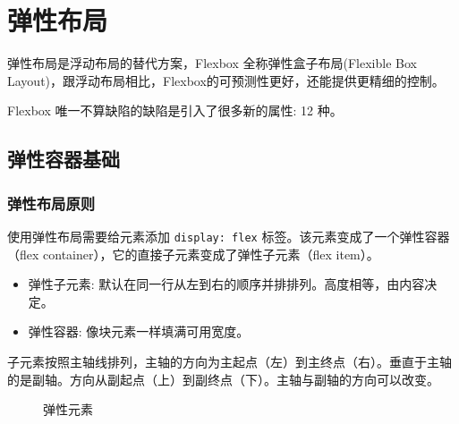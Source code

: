 \section{弹性布局}

弹性布局是浮动布局的替代方案，Flexbox 全称弹性盒子布局(Flexible Box Layout)，跟浮动布局相比，Flexbox的可预测性更好，还能提供更精细的控制。

Flexbox 唯一不算缺陷的缺陷是引入了很多新的属性: 12 种。

\subsection{弹性容器基础}

\subsubsection*{弹性布局原则}

使用弹性布局需要给元素添加 \texttt{display: flex} 标签。该元素变成了一个弹性容器（flex container），它的直接子元素变成了弹性子元素（flex item）。
\begin{itemize}
    \item 弹性子元素: 默认在同一行从左到右的顺序并排排列。高度相等，由内容决定。
    \item 弹性容器: 像块元素一样填满可用宽度。
\end{itemize}


子元素按照主轴线排列，主轴的方向为主起点（左）到主终点（右）。垂直于主轴的是副轴。方向从副起点（上）到副终点（下）。主轴与副轴的方向可以改变。

\begin{figure}[H]
    \small
    \centering
    \caption{弹性元素}
    \label{fig:弹性元素}
\end{figure}

